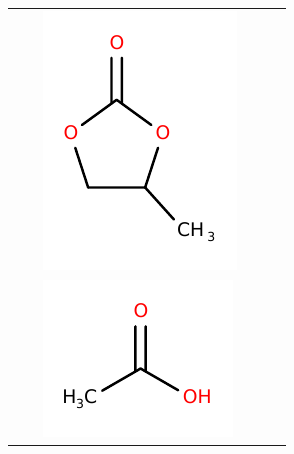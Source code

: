 \documentclass[journal=jpcbfk,manuscript=article]{achemso}
\begin{document}
\begin{table}[h!]
\begin{tabular}{ |m{3.5cm}m{1.4cm}m{2cm}|m{3.8cm}m{1.4cm}m{2cm}| }
    \color{amber}{propylene carbonate} & \color{amber}{PC} &     
    \begin{minipage}{.1\textwidth}
    \includegraphics[width=\linewidth]{structures/PCB.pdf}
    \end{minipage} \\
    
    \color{green!40!olive}{acetic acid} & \color{green!40!olive}{AcOH} &     
    \begin{minipage}{.1\textwidth}
    \includegraphics[width=\linewidth]{structures/ACH.pdf}
    \end{minipage} &


\end{tabular}
\end{table}
\end{document}
